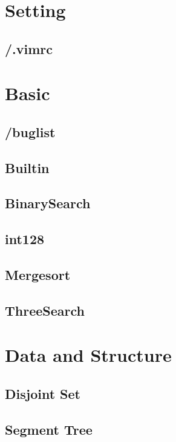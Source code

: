 \section{Setting}

\subsection{/.vimrc}


\section{Basic}

\subsection{/buglist}

\subsection{Builtin}

\subsection{BinarySearch}

\subsection{int128}

\subsection{Mergesort}

\subsection{ThreeSearch}


\section{Data and Structure}

\subsection{Disjoint Set}

\subsection{Segment Tree}

